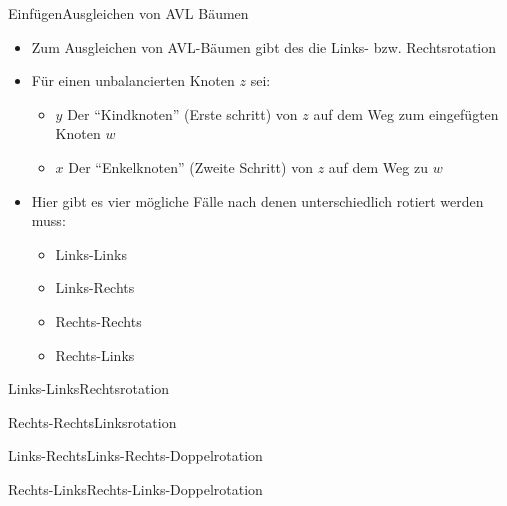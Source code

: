 \begin{frame}{Einfügen}{Ausgleichen von AVL Bäumen}
	\begin{itemize}
		\item Zum Ausgleichen von AVL-Bäumen gibt des die Links- bzw. Rechtsrotation
		\item Für einen unbalancierten Knoten $z$ sei:
		\begin{itemize}
			\item $y$ Der "`Kindknoten"' (Erste schritt) von $z$ auf dem Weg zum eingefügten Knoten $w$
			\item $x$ Der "`Enkelknoten"' (Zweite Schritt) von $z$ auf dem Weg zu $w$
		\end{itemize}
		\item Hier gibt es vier mögliche Fälle nach denen unterschiedlich rotiert werden muss:
		\begin{itemize}
			\item Links-Links
			\item Links-Rechts
			\item Rechts-Rechts
			\item Rechts-Links
		\end{itemize}
	\end{itemize}
\end{frame}

\begin{frame}{Links-Links}{Rechtsrotation}
\end{frame}

\begin{frame}{Rechts-Rechts}{Linksrotation}
\end{frame}

\begin{frame}{Links-Rechts}{Links-Rechts-Doppelrotation}
\end{frame}

\begin{frame}{Rechts-Links}{Rechts-Links-Doppelrotation}
\end{frame}